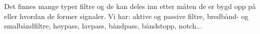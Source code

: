 Det finnes mange typer filtre og de kan deles inn etter måten de er bygd opp på
eller hvordan de former signaler.
Vi har: aktive og passive filtre, bredbånd- og smalbåndfiltre,
høypass, lavpass, båndpass, båndstopp, notch...
